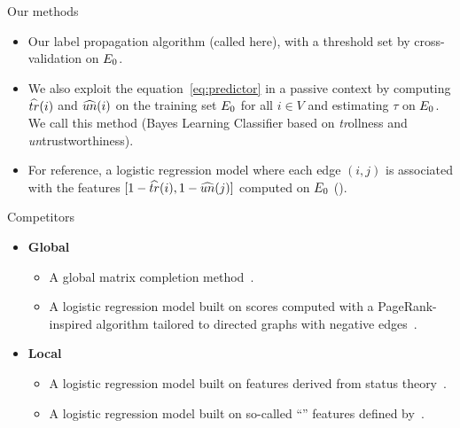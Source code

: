 \documentclass[10pt,svgnames,ignorenonframetext,final]{beamer}
\providecommand{\largelist}{%
  \setlength{\itemsep}{8pt}\setlength{\parskip}{3pt}}
\begin{document}
%


%

\begin{frame}{Our methods}
\begin{itemize}
  \largelist
\item
  Our \alert{label propagation algorithm} (called \uslpropGsec{} here), with a
  threshold set by cross-validation on \(E_0{}\).
\item
  We also exploit the \alert{equation~\eqref{eq:predictor} in a passive context} by computing
  \(\widehat{tr}(i)\) and \(\widehat{un}(i)\) on the training set \(E_0\) for all
  \(i \in V\) and estimating \(\tau\) on \(E_0\). We call this
  method \usrule{} (Bayes Learning Classifier based on \emph{tr}ollness
  and \emph{un}trustworthiness).
\item
  For reference, \alert{a logistic regression model} where each edge \((i,j)\) is associated
  with the features \([1-\widehat{tr}(i),  1-\widehat{un}(j)]\) computed on \(E_0\)
  (\uslogregp{}).
\end{itemize}
\end{frame}

\begin{frame}{Competitors}
  \begin{itemize}
    \largelist
  \item \textbf{Global}
    \begin{itemize}
    \largelist
      \item
        A global \complowrank{} matrix completion
        method~\autocite{lowrankcompletion14}.
      \item
        A logistic regression model built on \compranknodes{} scores computed
        with a PageRank-inspired algorithm tailored to directed graphs with
        negative edges~\autocite{wu2016troll}.
    \end{itemize}
  \item \textbf{Local}
    \begin{itemize}
    \largelist
      \item
        A logistic regression model built on \comptriads{} features derived
        from status theory~\autocite{leskovec2010}.
      \item
        A logistic regression model built on so-called ``\compbayesian{}''
        features defined by~\autocite{Bayesian15}.
    \end{itemize}
\end{itemize}

\end{frame}
\end{document}
